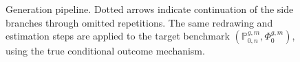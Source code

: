 \begin{figure}[!t]
{
}
\caption{Generation pipeline. Dotted arrows indicate continuation of the side branches through omitted repetitions. The same redrawing and estimation steps are applied to the target benchmark \((\mathbb P_{0,n}^{g,m},\Phi_0^{g,m})\), using the true conditional outcome mechanism.}
\label{fig:generation_pipeline}
\end{figure}
